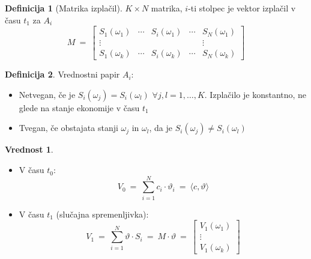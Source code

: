\documentclass[11pt]{article}
\theoremstyle{definition}
\newtheorem{definicija}{Definicija}[section]
\theoremstyle{definition}
\newtheorem{vrednost}{Vrednost}
\begin{document}
\begin{definicija}[Matrika izplačil]

$K \times N$ matrika, $i$-ti stolpec je vektor izplačil v času $t_1$ za $A_i$
$$M ~=~ \begin{bmatrix}
S_1(\omega_1) & \cdots & S_i(\omega_1) & \cdots & S_N(\omega_1) \\
\vdots & ~ & ~ & ~ & \vdots \\
S_1(\omega_k) & \cdots & S_i(\omega_k) & \cdots & S_N(\omega_k)
\end{bmatrix}$$

\end{definicija}
\vspace{0.5cm}

\begin{definicija}

Vrednostni papir $A_i$:
\begin{itemize}

	\item Netvegan, če je $S_i(\omega_j) = S_i(\omega_l)$ $\forall j,l = 1, \ldots, K$. Izplačilo je konstantno, ne glede na stanje ekonomije v času $t_1$
	\item Tvegan, če obstajata stanji $\omega_j$ in $\omega_l$, da je $S_i(\omega_j) \neq S_i(\omega_l)$

\end{itemize}

\end{definicija}
\vspace{0.5cm}

\begin{vrednost}
\vspace{0.5cm}
~\\
\begin{itemize}

	\item V času $t_0$:
	$$V_0 ~=~ \sum_{i=1}^N c_i \cdot \vartheta_i ~=~ \langle c, \vartheta \rangle$$
	
	\item V času $t_1$ (slučajna spremenljivka):
	$$V_1 ~=~ \sum_{i=1}^N \vartheta \cdot S_i ~=~ M \cdot \vartheta ~=~ \begin{bmatrix}
	V_1(\omega_1) \\
	\vdots \\
	V_1(\omega_k)
	\end{bmatrix}$$

\end{itemize}

\end{vrednost}
\vspace{0.5cm}
\end{document}
